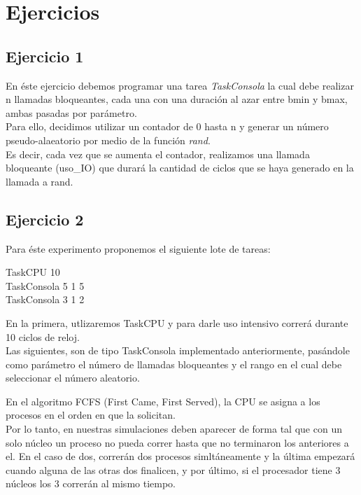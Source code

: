 \section{Ejercicios}

\subsection{Ejercicio 1}
En \'este ejercicio debemos programar una tarea \textit{TaskConsola} la cual debe realizar n llamadas bloqueantes, cada una con una duraci\'on al azar entre bmin y bmax, ambas pasadas por par\'ametro.\\

Para ello, decidimos utilizar un contador de 0 hasta n y generar un n\'umero pseudo-alaeatorio por medio de la funci\'on \textit{rand}.\\
Es decir, cada vez que se aumenta el contador, realizamos una llamada bloqueante (uso\_IO) que durar\'a la cantidad de ciclos que se haya generado en la llamada a rand.

\subsection{Ejercicio 2}
Para \'este experimento proponemos el siguiente lote de tareas:

\begin{center}
TaskCPU 10\\
TaskConsola 5 1 5\\
TaskConsola 3 1 2
\end{center}

En la primera, utlizaremos TaskCPU y para darle uso intensivo correr\'a durante 10 ciclos de reloj.\\
Las siguientes, son de tipo TaskConsola implementado anteriormente, pas\'andole como par\'ametro el n\'umero de llamadas bloqueantes y el rango en el cual debe seleccionar el n\'umero aleatorio.

En el algoritmo FCFS (First Came, First Served), la CPU se asigna a los procesos en el orden en que la solicitan.\\
Por lo tanto, en nuestras simulaciones deben aparecer de forma tal que con un solo n\'ucleo un proceso no pueda correr hasta que no terminaron los anteriores a el.
En el caso de dos, correr\'an dos procesos simlt\'aneamente y la \'ultima empezar\'a cuando alguna de las otras dos finalicen, y por \'ultimo, si el procesador tiene 3 n\'ucleos los 3 correr\'an al mismo tiempo.

